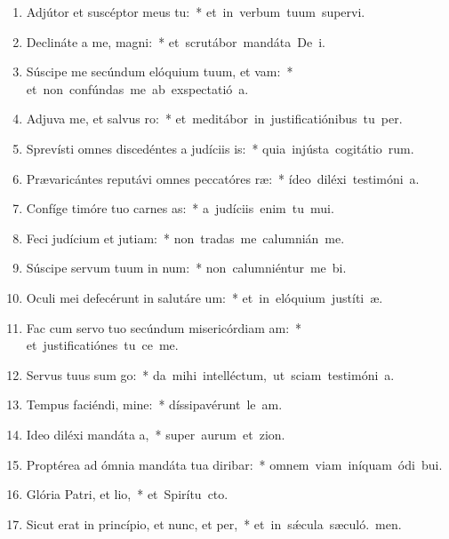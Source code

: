 \begin{flushleft}
\begin{enumerate}[leftmargin=*]
\item Adjútor et suscéptor meus  tu:~* \mbox{et in verbum tuum supervi.}
\item Declináte a me, magni:~* \mbox{et scrutábor mandáta De i.}
\item Súscipe me secúndum elóquium tuum, et vam:~* \mbox{et non confúndas me ab exspectatió a.}
\item Adjuva me, et salvus ro:~* \mbox{et meditábor in justificatiónibus tu per.}
\item Sprevísti omnes discedéntes a judíciis is:~* \mbox{quia injústa cogitátio rum.}
\item Prævaricántes reputávi omnes peccatóres ræ:~* \mbox{ídeo diléxi testimóni a.}
\item Confíge timóre tuo carnes as:~* \mbox{a judíciis enim tu mui.}
\item Feci judícium et jutiam:~* \mbox{non tradas me calumnián me.}
\item Súscipe servum tuum in num:~* \mbox{non calumniéntur me bi.}
\item Oculi mei defecérunt in salutáre um:~* \mbox{et in elóquium justíti æ.}
\item Fac cum servo tuo secúndum misericórdiam am:~* \mbox{et justificatiónes tu ce me.}
\item Servus tuus sum go:~* \mbox{da mihi intelléctum, ut sciam testimóni a.}
\item Tempus faciéndi, mine:~* \mbox{díssipavérunt le am.}
\item Ideo diléxi mandáta a,~* \mbox{super aurum et zion.}
\item Proptérea ad ómnia mandáta tua diribar:~* \mbox{omnem viam iníquam ódi bui.}
\item Glória Patri, et lio,~* \mbox{et Spirítu cto.}
\item Sicut erat in princípio, et nunc, et per,~* \mbox{et in s\'{\ae}cula sæculó. men.}

\end{enumerate}
\end{flushleft}

